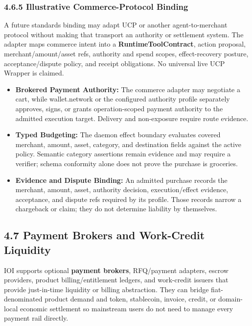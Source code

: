 \documentclass[
  11pt,
]{article}
\providecommand{\tightlist}{%
  \setlength{\itemsep}{0pt}\setlength{\parskip}{0pt}}
\begin{document}
\hypertarget{the-ucp-commerce-wrapper}{%
\subsubsection{4.6.5 Illustrative Commerce-Protocol
Binding}\label{the-ucp-commerce-wrapper}}

A future standards binding may adapt UCP or another agent-to-merchant protocol
without making that transport an authority or settlement system. The adapter
maps commerce intent into a \textbf{RuntimeToolContract}, action proposal,
merchant/amount/asset refs, authority and spend scopes, effect-recovery posture,
acceptance/dispute policy, and receipt obligations. No universal live UCP
Wrapper is claimed.

\begin{itemize}
\tightlist
\item
  \textbf{Brokered Payment Authority:} The commerce adapter may negotiate a
  cart, while wallet.network or the configured authority profile separately
  approves, signs, or grants operation-scoped payment authority to the admitted
  execution target. Delivery and non-exposure require route evidence.
\item
  \textbf{Typed Budgeting:} The daemon effect boundary evaluates covered
  merchant, amount, asset, category, and destination fields against the active
  policy. Semantic category assertions remain evidence and may require a
  verifier; schema conformity alone does not prove the purchase is groceries.
\item
  \textbf{Evidence and Dispute Binding:} An admitted purchase records the
  merchant, amount, asset, authority decision, execution/effect evidence,
  acceptance, and dispute refs required by its profile. Those records narrow a
  chargeback or claim; they do not determine liability by themselves.
\end{itemize}

\hypertarget{payment-brokers-and-work-credit-liquidity}{%
\subsection{4.7 Payment Brokers and Work-Credit
Liquidity}\label{payment-brokers-and-work-credit-liquidity}}

IOI supports optional \textbf{payment brokers}, RFQ/payment adapters,
escrow providers, product billing/entitlement ledgers, and work-credit issuers that provide
just-in-time liquidity or billing abstraction. They can bridge
fiat-denominated product demand and token, stablecoin, invoice, credit, or
domain-local economic settlement so mainstream users do not need to manage every
payment rail directly.
\end{document}
